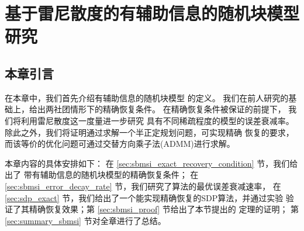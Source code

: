 \chapter{基于雷尼散度的有辅助信息的随机块模型研究}
\label{chap:sbmsi}
\section{本章引言}
在本章中，我们首先介绍有辅助信息的随机块模型
的定义。
我们在前人研究的基础上，给出两社团情形下的精确恢复条件。
在精确恢复条件被保证的前提下，
我们将利用雷尼散度这一度量进一步研究
具有不同稀疏程度的模型的误差衰减率。
除此之外，我们将证明通过求解一个半正定规划问题，可实现精确
恢复的要求，而该等价的优化问题可通过交替方向乘子法(ADMM)进行求解。

本章内容的具体安排如下：
在 \ref{sec:sbmsi_exact_recovery_condition} 节，我们给出了
带有辅助信息的随机块模型的精确恢复条件；
在 \ref{sec:sbmsi_error_decay_rate} 节，我们研究了算法的最优误差衰减速率，
在 \ref{sec:sdp_exact} 节，我们给出了一个能实现精确恢复的SDP算法，并通过实验
验证了其精确恢复效果；第 \ref{sec:sbmsi_proof} 节给出了本节提出的
定理的证明；
第 \ref{sec:summary_sbmsi} 节对全章进行了总结。

